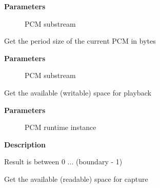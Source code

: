 \documentclass[a4paper,8pt,english]{sphinxmanual}
\begin{document}
\textbf{Parameters}
\begin{description}
\item[{}] \leavevmode
PCM substream

\end{description}

\begin{fulllineitems}
\label{sound/kernel-api/alsa-driver-api:c.snd_pcm_lib_period_bytes}
Get the period size of the current PCM in bytes

\end{fulllineitems}


\textbf{Parameters}
\begin{description}
\item[{}] \leavevmode
PCM substream

\end{description}

\begin{fulllineitems}
\label{sound/kernel-api/alsa-driver-api:c.snd_pcm_playback_avail}
Get the available (writable) space for playback

\end{fulllineitems}


\textbf{Parameters}
\begin{description}
\item[{}] \leavevmode
PCM runtime instance

\end{description}

\textbf{Description}

Result is between 0 ... (boundary - 1)

\begin{fulllineitems}
\label{sound/kernel-api/alsa-driver-api:c.snd_pcm_capture_avail}
Get the available (readable) space for capture

\end{fulllineitems}
\end{document}
